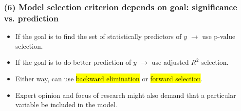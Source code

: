 \documentclass[11pt,containsverbatim,handout,xcolor=xelatex,dvipsnames,table]{beamer}
\begin{document}
\begin{frame}
\frametitle{(6) Model selection criterion depends on goal: significance vs. prediction}

\begin{itemize}

\item If the goal is to find the set of statistically predictors of $y$ $\rightarrow$ use p-value selection.

\pause

\item If the goal is to do better prediction of $y$ $\rightarrow$ use adjusted $R^2$ selection.

\pause

\item Either way, can use \hl{backward elimination} or \hl{forward selection}.

\pause

\item Expert opinion and focus of research might also demand that a particular variable be included in the model.

\end{itemize}

\end{frame}

\end{document}
